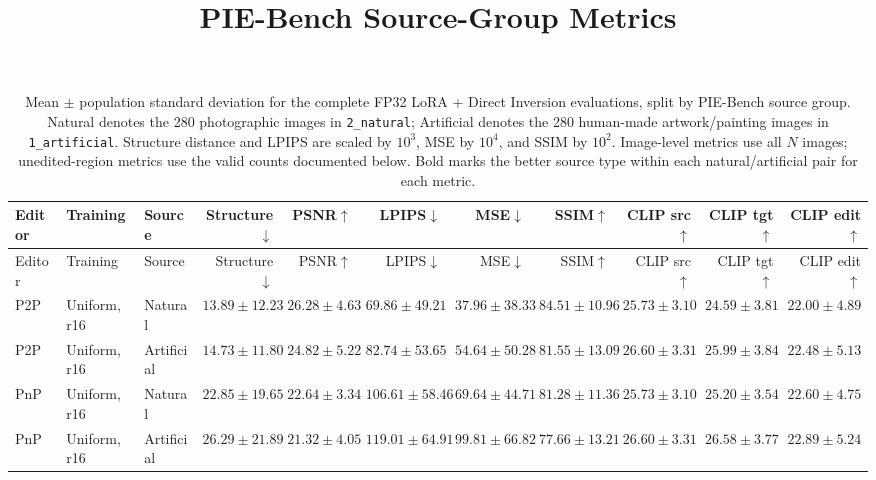 \documentclass[11pt]{article}
\title{PIE-Bench Source-Group Metrics}
\date{}
\begin{document}
\maketitle
\fontsize{5.5pt}{6.3pt}\selectfont
\setlength{\tabcolsep}{1pt}
\renewcommand{\arraystretch}{0.88}
\setlength{\LTleft}{0pt}
\setlength{\LTright}{0pt}
\setlength{\LTpre}{0pt}
\setlength{\LTpost}{0pt}
\begin{longtable}{@{}lllrrrrrrrr@{}}
\caption{Mean $\pm$ population standard deviation for the complete FP32 LoRA + Direct Inversion evaluations, split by PIE-Bench source group. Natural denotes the 280 photographic images in \texttt{2\_natural}; Artificial denotes the 280 human-made artwork/painting images in \texttt{1\_artificial}. Structure distance and LPIPS are scaled by $10^3$, MSE by $10^4$, and SSIM by $10^2$. Image-level metrics use all $N$ images; unedited-region metrics use the valid counts documented below. Bold marks the better source type within each natural/artificial pair for each metric.}\label{tab:pnp-lora-source-groups}\\
\toprule
Editor & Training & Source & Structure$\downarrow$ & PSNR$\uparrow$ & LPIPS$\downarrow$ & MSE$\downarrow$ & SSIM$\uparrow$ & CLIP src$\uparrow$ & CLIP tgt$\uparrow$ & CLIP edit$\uparrow$ \\
\midrule
\endfirsthead
\toprule
Editor & Training & Source & Structure$\downarrow$ & PSNR$\uparrow$ & LPIPS$\downarrow$ & MSE$\downarrow$ & SSIM$\uparrow$ & CLIP src$\uparrow$ & CLIP tgt$\uparrow$ & CLIP edit$\uparrow$ \\
\midrule
\endhead
P2P & Uniform, r16 & Natural & $\mathbf{13.89 \pm 12.23}$ & $\mathbf{26.28 \pm 4.63}$ & $\mathbf{69.86 \pm 49.21}$ & $\mathbf{37.96 \pm 38.33}$ & $\mathbf{84.51 \pm 10.96}$ & $25.73 \pm 3.10$ & $24.59 \pm 3.81$ & $22.00 \pm 4.89$ \\
P2P & Uniform, r16 & Artificial & $14.73 \pm 11.80$ & $24.82 \pm 5.22$ & $82.74 \pm 53.65$ & $54.64 \pm 50.28$ & $81.55 \pm 13.09$ & $\mathbf{26.60 \pm 3.31}$ & $\mathbf{25.99 \pm 3.84}$ & $\mathbf{22.48 \pm 5.13}$ \\
\midrule
PnP & Uniform, r16 & Natural & $\mathbf{22.85 \pm 19.65}$ & $\mathbf{22.64 \pm 3.34}$ & $\mathbf{106.61 \pm 58.46}$ & $\mathbf{69.64 \pm 44.71}$ & $\mathbf{81.28 \pm 11.36}$ & $25.73 \pm 3.10$ & $25.20 \pm 3.54$ & $22.60 \pm 4.75$ \\
PnP & Uniform, r16 & Artificial & $26.29 \pm 21.89$ & $21.32 \pm 4.05$ & $119.01 \pm 64.91$ & $99.81 \pm 66.82$ & $77.66 \pm 13.21$ & $\mathbf{26.60 \pm 3.31}$ & $\mathbf{26.58 \pm 3.77}$ & $\mathbf{22.89 \pm 5.24}$ \\

\end{longtable}
\end{document}
